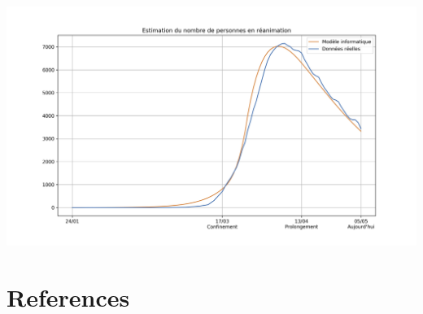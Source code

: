 \documentclass[review]{elsarticle}
\begin{document}
\begin{center}
  \includegraphics[width=0.8\linewidth]{../slides/figure1.jpg}
\end{center}

\section*{References}


\nocite{*}
\end{document}

